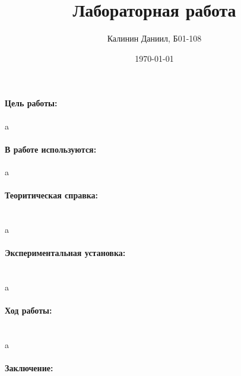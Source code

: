 \documentclass[a4paper, 12pt]{article}
\author{Калинин Даниил, Б01-108}
\date{\today}
\title{Лабораторная работа }
\newcommand{\parag}[1]{\paragraph*{#1:}}
\begin{document}
\maketitle
\parindent=0cm

\parag {Цель работы}
a
\parag {В работе используются}
a
\parag {Теоритическая справка} ~\\
a
\parag {Экспериментальная установка}~\\
a
\parag {Ход работы} ~\\
a
\parag {Заключение} ~\\
\end{document}
